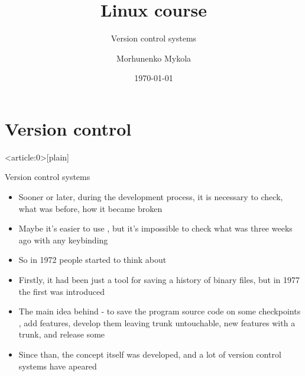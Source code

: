 \documentclass[usenames,dvipsnames,10pt,aspectratio=169]{beamer}
\title{Linux course}
\subtitle{Version control systems}
\date[\today]{\small\today}
\author[Morhunenko Mykola]{Morhunenko Mykola}
\institute{APPS@UCU}
\begin{document}
\begin{frame}
\titlepage
\end{frame}

\begin{frame}{\contentsname}
    \tableofcontents
\end{frame}

\section{Version control}
{ %
    \begin{frame}<article:0>[plain]
     \end{frame}
}

\begin{frame}{Version control systems}    
    \begin{itemize}
        \item Sooner or later, during the development process, it is necessary to check, 
        what was before, how it became broken
        \item Maybe it's easier to use , but it's impossible to check what was three weeks 
        ago with any keybinding
        \item So in 1972 people started to think about 
        \item Firstly, it had been just a tool for saving a history of binary files, but in 1977 
        the first  was introduced
        \item The main idea behind - to save the program source code on some checkpoints
        , add features, develop them leaving trunk untouchable,  new features with a trunk, and release some 
        \item Since than, the concept itself was developed, and a lot of version control systems have apeared
    \end{itemize}
\end{frame}
\end{document}
